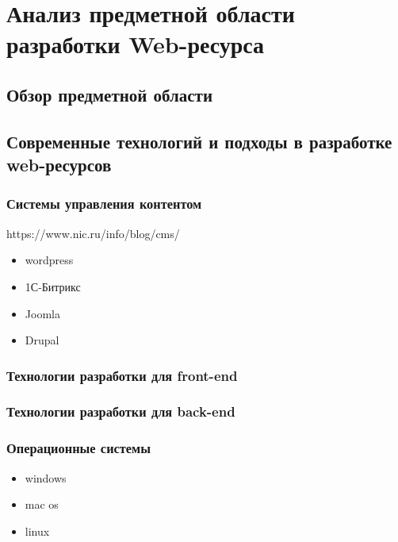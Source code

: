 \section{Анализ предметной области разработки Web-ресурса}
\subsection{Обзор предметной области}

\subsection{Современные технологий и подходы в разработке web-ресурсов}
    \subsubsection{Системы управления контентом}
        https://www.nic.ru/info/blog/cms/
        \begin{itemize}
            \item wordpress
            \item 1С-Битрикс
            \item Joomla
            \item Drupal
        \end{itemize}

    \subsubsection{Технологии разработки для front-end}
    
    \subsubsection{Технологии разработки для back-end}

    \subsubsection{Операционные системы}
        \begin{itemize}
            \item windows
            \item mac os
            \item linux
        \end{itemize}
        
